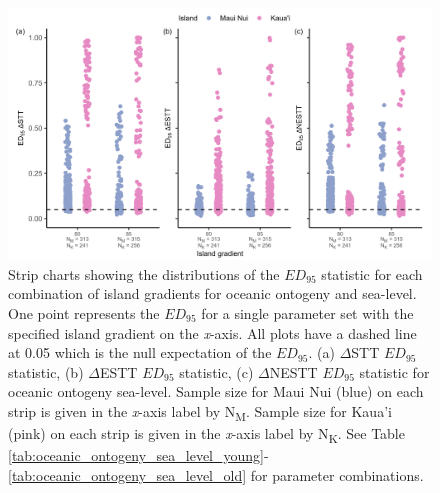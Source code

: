 \begin{figure}
    \centering
    \includegraphics[width=\textwidth]{JBI-21-0508_FigS8.png}
    \caption{Strip charts showing the distributions of the $ED_{95}$ statistic for each combination of island gradients for oceanic ontogeny and sea-level. One point represents the $ED_{95}$ for a single parameter set with the specified island gradient on the \textit{x}-axis. All plots have a dashed line at 0.05 which is the null expectation of the $ED_{95}$. (a) $\Delta$STT $ED_{95}$ statistic, (b) $\Delta$ESTT $ED_{95}$ statistic, (c) $\Delta$NESTT $ED_{95}$ statistic for oceanic ontogeny sea-level. Sample size for Maui Nui (blue) on each strip is given in the \textit{x}-axis label by N\textsubscript{M}. Sample size for Kaua'i (pink) on each strip is given in the \textit{x}-axis label by N\textsubscript{K}.  See Table \ref{tab:oceanic_ontogeny_sea_level_young}-\ref{tab:oceanic_ontogeny_sea_level_old} for parameter combinations.}
    \label{fig:oceanic_ontogeny_sea_level_gradient_nltt}
\end{figure}

